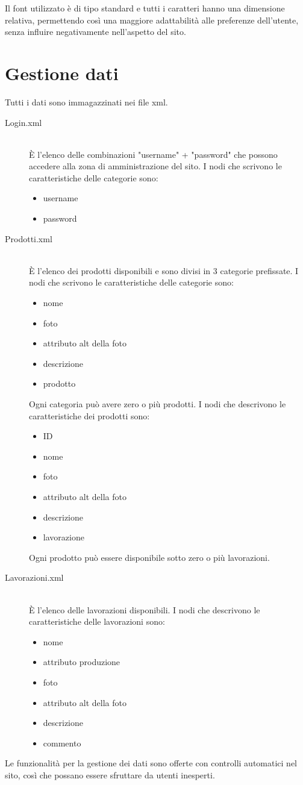 \documentclass[11pt]{article}
\begin{document}
Il font utilizzato è di tipo standard e tutti i caratteri hanno una dimensione relativa, permettendo così una maggiore adattabilità alle preferenze dell'utente, senza influire negativamente nell'aspetto del sito.

\newpage
\section{Gestione dati}
Tutti i dati sono immagazzinati nei file xml.
\begin{description}
	\item[Login.xml]\hfill \\
	È l'elenco delle combinazioni "username" + "password" che possono accedere alla zona di amministrazione del sito.
	I nodi che scrivono le caratteristiche delle categorie sono:
	\begin{itemize}
		\item username
		\item password
	\end{itemize}
	\item[Prodotti.xml] \hfill\\È l'elenco dei prodotti disponibili e sono divisi in 3 categorie prefissate.
	I nodi che scrivono le caratteristiche delle categorie sono:
	\begin{itemize}
		\item nome
		\item foto
		\item attributo alt della foto
		\item descrizione
		\item prodotto
	\end{itemize}
	Ogni categoria può avere zero o più prodotti.
	I nodi che descrivono le caratteristiche dei prodotti sono:
	\begin{itemize}
		\item ID
		\item nome
		\item foto
		\item attributo alt della foto
		\item descrizione
		\item lavorazione
	\end{itemize}
	Ogni prodotto può essere disponibile sotto zero o più lavorazioni.
	\item[Lavorazioni.xml]\hfill \\ È l'elenco delle lavorazioni disponibili. 
	I nodi che descrivono le caratteristiche delle lavorazioni sono:
	\begin{itemize}
		\item nome
		\item attributo produzione
		\item foto
		\item attributo alt della foto
		\item descrizione
		\item commento
	\end{itemize}
\end{description}
Le funzionalità per la gestione dei dati sono offerte con controlli automatici nel sito, così che possano essere sfruttare da utenti inesperti.
\end{document}
